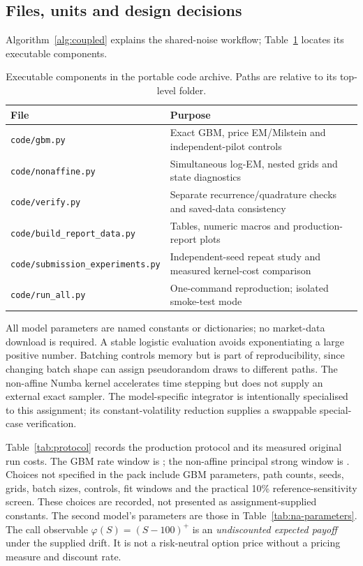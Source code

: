 \documentclass[11pt,a4paper]{article}
\begin{document}
\subsection{Files, units and design decisions}
Algorithm~\ref{alg:coupled} explains the shared-noise workflow; Table~\ref{tab:code-files} locates its executable components.
\begin{table}[H]\centering\small
\caption{Executable components in the portable code archive. Paths are relative to its top-level folder.}\label{tab:code-files}
\begin{tabular}{lp{9cm}}\toprule
File & Purpose\\\midrule
\texttt{code/gbm.py} & Exact GBM, price EM/Milstein and independent-pilot controls\\
\texttt{code/nonaffine.py} & Simultaneous log-EM, nested grids and state diagnostics\\
\texttt{code/verify.py} & Separate recurrence/quadrature checks and saved-data consistency\\
\texttt{code/build\_report\_data.py} & Tables, numeric macros and production-report plots\\
\texttt{code/submission\_experiments.py} & Independent-seed repeat study and measured kernel-cost comparison\\
\texttt{code/run\_all.py} & One-command reproduction; isolated smoke-test mode\\\bottomrule
\end{tabular}
\end{table}
All model parameters are named constants or dictionaries; no market-data download is required. A stable logistic evaluation avoids exponentiating a large positive number. Batching controls memory but is part of reproducibility, since changing batch shape can assign pseudorandom draws to different paths. The non-affine Numba kernel accelerates time stepping but does not supply an external exact sampler. The model-specific integrator is intentionally specialised to this assignment; its constant-volatility reduction supplies a swappable special-case verification.


Table~\ref{tab:protocol} records the production protocol and its measured original run costs.
The GBM rate window is \GBMFitWindow{}; the non-affine principal strong window is \NAFitWindow{}. Choices not specified in the pack include GBM parameters, path counts, seeds, grids, batch sizes, controls, fit windows and the practical 10\% reference-sensitivity screen. These choices are recorded, not presented as assignment-supplied constants. The second model's parameters are those in Table~\ref{tab:na-parameters}.
The call observable $\varphi(S)=(S-100)^+$ is an \emph{undiscounted expected payoff} under the supplied drift. It is not a risk-neutral option price without a pricing measure and discount rate.
\newpage
\end{document}
